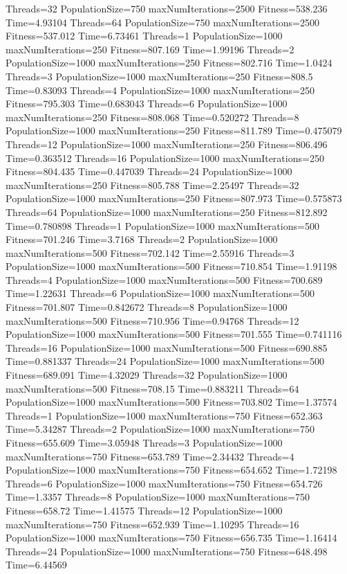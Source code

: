 \documentclass[10pt,letterpaper]{article}
\begin{document}
Threads=32 PopulationSize=750 maxNumIterations=2500 Fitness=538.236 Time=4.93104
Threads=64 PopulationSize=750 maxNumIterations=2500 Fitness=537.012 Time=6.73461
Threads=1 PopulationSize=1000 maxNumIterations=250 Fitness=807.169 Time=1.99196
Threads=2 PopulationSize=1000 maxNumIterations=250 Fitness=802.716 Time=1.0424
Threads=3 PopulationSize=1000 maxNumIterations=250 Fitness=808.5 Time=0.83093
Threads=4 PopulationSize=1000 maxNumIterations=250 Fitness=795.303 Time=0.683043
Threads=6 PopulationSize=1000 maxNumIterations=250 Fitness=808.068 Time=0.520272
Threads=8 PopulationSize=1000 maxNumIterations=250 Fitness=811.789 Time=0.475079
Threads=12 PopulationSize=1000 maxNumIterations=250 Fitness=806.496 Time=0.363512
Threads=16 PopulationSize=1000 maxNumIterations=250 Fitness=804.435 Time=0.447039
Threads=24 PopulationSize=1000 maxNumIterations=250 Fitness=805.788 Time=2.25497
Threads=32 PopulationSize=1000 maxNumIterations=250 Fitness=807.973 Time=0.575873
Threads=64 PopulationSize=1000 maxNumIterations=250 Fitness=812.892 Time=0.780898
Threads=1 PopulationSize=1000 maxNumIterations=500 Fitness=701.246 Time=3.7168
Threads=2 PopulationSize=1000 maxNumIterations=500 Fitness=702.142 Time=2.55916
Threads=3 PopulationSize=1000 maxNumIterations=500 Fitness=710.854 Time=1.91198
Threads=4 PopulationSize=1000 maxNumIterations=500 Fitness=700.689 Time=1.22631
Threads=6 PopulationSize=1000 maxNumIterations=500 Fitness=701.807 Time=0.842672
Threads=8 PopulationSize=1000 maxNumIterations=500 Fitness=710.956 Time=0.94768
Threads=12 PopulationSize=1000 maxNumIterations=500 Fitness=701.555 Time=0.741116
Threads=16 PopulationSize=1000 maxNumIterations=500 Fitness=690.885 Time=0.881337
Threads=24 PopulationSize=1000 maxNumIterations=500 Fitness=689.091 Time=4.32029
Threads=32 PopulationSize=1000 maxNumIterations=500 Fitness=708.15 Time=0.883211
Threads=64 PopulationSize=1000 maxNumIterations=500 Fitness=703.802 Time=1.37574
Threads=1 PopulationSize=1000 maxNumIterations=750 Fitness=652.363 Time=5.34287
Threads=2 PopulationSize=1000 maxNumIterations=750 Fitness=655.609 Time=3.05948
Threads=3 PopulationSize=1000 maxNumIterations=750 Fitness=653.789 Time=2.34432
Threads=4 PopulationSize=1000 maxNumIterations=750 Fitness=654.652 Time=1.72198
Threads=6 PopulationSize=1000 maxNumIterations=750 Fitness=654.726 Time=1.3357
Threads=8 PopulationSize=1000 maxNumIterations=750 Fitness=658.72 Time=1.41575
Threads=12 PopulationSize=1000 maxNumIterations=750 Fitness=652.939 Time=1.10295
Threads=16 PopulationSize=1000 maxNumIterations=750 Fitness=656.735 Time=1.16414
Threads=24 PopulationSize=1000 maxNumIterations=750 Fitness=648.498 Time=6.44569
\end{document}
